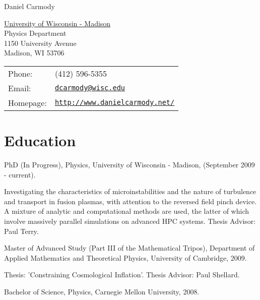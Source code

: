 \documentclass[letterpaper]{article}
\def\name{Daniel Carmody}
\renewenvironment{itemize}{
  \begin{list}{}{
    \setlength{\leftmargin}{1.5em}
  }
}{
  \end{list}
}
\begin{document}
{\huge \name}


\vspace{0.25in}

\begin{minipage}{0.45\linewidth}
  \href{http://www.wisc.edu/}{University of Wisconsin - Madison} \\
  Physics Department \\
  1150 University Avenue \\
  Madison, WI 53706
\end{minipage}
\begin{minipage}{0.45\linewidth}
  \begin{tabular}{ll}
    Phone: &  (412) 596-5355\\
    Email: & \href{mailto:dcarmody@wisc.edu}{\tt dcarmody@wisc.edu} \\
    Homepage: & \href{http://www.danielcarmody.net/}{\tt http://www.danielcarmody.net/} \\
  \end{tabular}
\end{minipage}




\section*{Education}

\begin{itemize}
	\item PhD (In Progress), Physics, University of Wisconsin - Madison, (September 2009 - current).
\begin{itemize}
\item Investigating the characteristics of microinstabilities and the nature of turbulence and transport in fusion plasmas, with attention to the reversed field pinch device. A mixture of analytic and computational methods are used, the latter of which involve massively parallel simulations on advanced HPC systems. Thesis Advisor: Paul Terry.
\end{itemize}
	\item Master of Advanced Study (Part III of the
 Mathematical Tripos), Department of Applied Mathematics and Theoretical Physics, University of Cambridge, 2009.
 \begin{itemize}
	\item Thesis: 'Constraining Cosmological Inflation'. Thesis Advisor: Paul Shellard.
\end{itemize}
	\item Bachelor of Science, Physics, Carnegie Mellon University, 2008.

\end{itemize}
\end{document}
